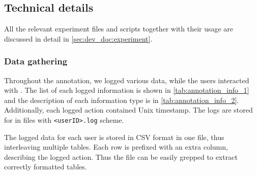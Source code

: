 
\subsection{Technical details} \label{subsec:experiment:technical_details}

All the relevant experiment files and scripts together with their usage are discussed in detail in \cref{sec:dev_doc:experiment}. 

\subsubsection{Data gathering}

Throughout the \ptakopet{} annotation, we logged various data, while the users interacted with \ptakopet{}. The list of each logged information is shown in \autoref{tab:annotation_info_1} and the description of each information type is in \autoref{tab:annotation_info_2}. Additionally, each logged action contained Unix timestamp. The logs are stored for in files with \texttt{<userID>.log} scheme.

The logged data for each user is stored in CSV format in one file, thus interleaving multiple tables. Each row is prefixed with an extra column, describing the logged action. Thus the file can be easily grepped to extract correctly formatted tables.

